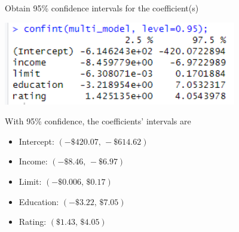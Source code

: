 Obtain 95\% confidence intervals for the coefficient(s)

\soln*
\begin{center}
    \includegraphics[width=4in]{img/ex2d.PNG}
\end{center}
With 95\% confidence, the coefficients' intervals are
\begin{itemize}
    \item Intercept: $(-\$420.07,\,-\$614.62)$
    \item Income: $(-\$8.46,\,-\$6.97)$
    \item Limit: $(-\$0.006,\,\$0.17)$
    \item Education: $(-\$3.22,\,\$7.05)$
    \item Rating: $(\$1.43,\,\$4.05)$
\end{itemize}


